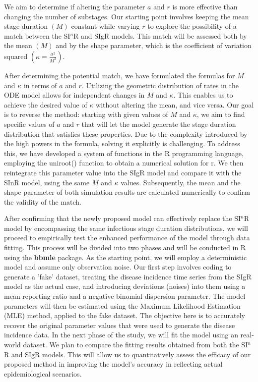 \documentclass[12pt]{article}
\begin{document}
We aim to determine if altering the parameter $a$ and $r$ is more effective than changing the number of substages. Our starting point involves keeping the mean stage duration $(M)$ constant while varying $r$ to explore the possibility of a match between the SI$^n$R and SIgR models. This match will be assessed both by the mean $(M)$ and by the shape parameter, which is the coefficient of variation squared $(\kappa = \frac{\sigma^2}{M^2})$.

After determining the potential match, we have formulated the formulas for $M$ and $\kappa$ in terms of $a$ and $r$. Utilizing the geometric distribution of rates in the ODE model allows for independent changes in $M$ and $\kappa$. This enables us to achieve the desired value of $\kappa$ without altering the mean, and vice versa. Our goal is to reverse the method: starting with given values of $M$ and $\kappa$, we aim to find specific values of $a$ and $r$ that will let the model generate the stage duration distribution that satisfies these properties. Due to the complexity introduced by the high powers in the formula, solving it explicitly is challenging. To address this, we have developed a system of functions in the R programming language, employing the uniroot() function to obtain a numerical solution for r. We then reintegrate this parameter value into the SIgR model and compare it with the SInR model, using the same $M$ and $\kappa$ values. Subsequently, the mean and the shape parameter of both simulation results are calculated numerically to confirm the validity of the match.

After confirming that the newly proposed model can effectively replace the SI$^n$R model by encompassing the same infectious stage duration distributions, we will proceed to empirically test the enhanced performance of the model through data fitting. This process will be divided into two phases and will be conducted in R using the \textbf{bbmle} package. As the starting point, we will employ a deterministic model and assume only observation noise. Our first step involves coding to generate a 'fake' dataset, treating the disease incidence time series from the SIgR model as the actual case, and introducing deviations (noises) into them using a mean reporting ratio and a negative binomial dispersion parameter. The model parameters will then be estimated using the Maximum Likelihood Estimation (MLE) method, applied to the fake dataset. The objective here is to accurately recover the original parameter values that were used to generate the disease incidence data. In the next phase of the study, we will fit the model using an real-world dataset. We plan to compare the fitting results obtained from both the SI$^n$R and SIgR models. This will allow us to quantitatively assess the efficacy of our proposed method in improving the model's accuracy in reflecting actual epidemiological scenarios.
\end{document}

